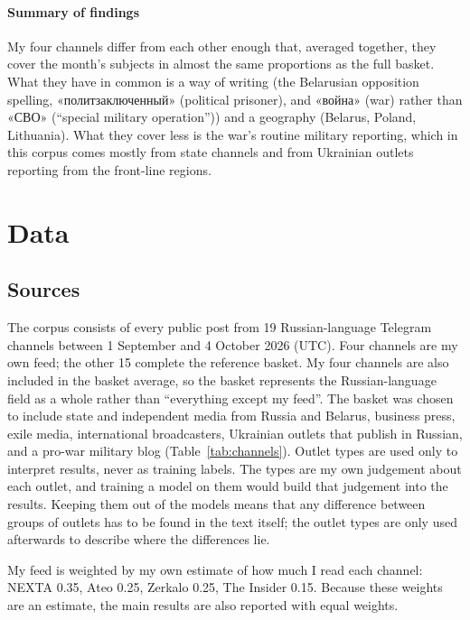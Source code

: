 \documentclass[11pt,a4paper]{article}
\newcommand{\ru}[2]{«#1» (#2)}
\begin{document}
\paragraph{Summary of findings} My four channels differ from each other enough that, averaged together, they cover the month's subjects in almost the same proportions as the full basket. What they have in common is a way of writing (the Belarusian opposition spelling, \ru{политзаключенный}{political prisoner}, and \ru{война}{war} rather than \ru{СВО}{``special military operation''}) and a geography (Belarus, Poland, Lithuania). What they cover less is the war's routine military reporting, which in this corpus comes mostly from state channels and from Ukrainian outlets reporting from the front-line regions.

\section{Data}
\label{sec:data}

\subsection{Sources}
The corpus consists of every public post from 19 Russian-language Telegram channels between 1 September and 4 October 2026 (UTC). Four channels are my own feed; the other 15 complete the reference basket. My four channels are also included in the basket average, so the basket represents the Russian-language field as a whole rather than ``everything except my feed''. The basket was chosen to include state and independent media from Russia and Belarus, business press, exile media, international broadcasters, Ukrainian outlets that publish in Russian, and a pro-war military blog (Table~\ref{tab:channels}). Outlet types are used only to interpret results, never as training labels. The types are my own judgement about each outlet, and training a model on them would build that judgement into the results. Keeping them out of the models means that any difference between groups of outlets has to be found in the text itself; the outlet types are only used afterwards to describe where the differences lie.

My feed is weighted by my own estimate of how much I read each channel: NEXTA 0.35, Ateo 0.25, Zerkalo 0.25, The Insider 0.15. Because these weights are an estimate, the main results are also reported with equal weights.
\end{document}
